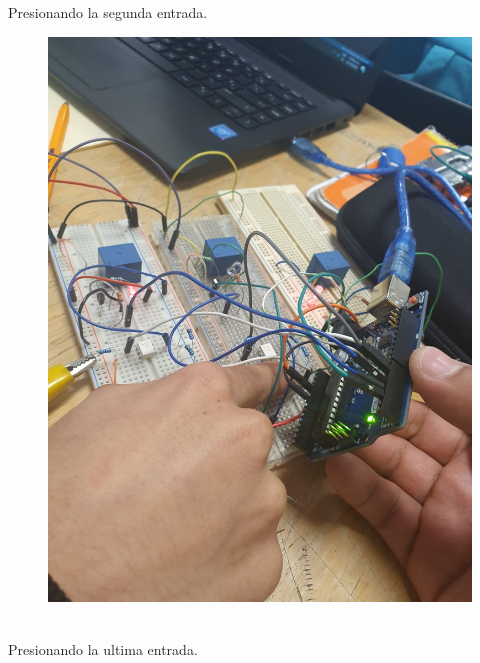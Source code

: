 \documentclass[11pt,a4paper]{article}
\begin{document}
Presionando la segunda entrada.
\begin{figure}[hbtp]
\centering
\includegraphics[scale=0.27]{004.png} 
\end{figure}\\
Presionando la ultima entrada.
\end{document}
